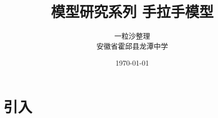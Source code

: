 \documentclass[10pt]{ctexart}
\title{模型研究系列 \quad 手拉手模型}
\author{一粒沙整理\\安徽省霍邱县龙潭中学}
\date{\today}
\begin{document}
\maketitle
\tableofcontents


\section{引入}
\end{document}
